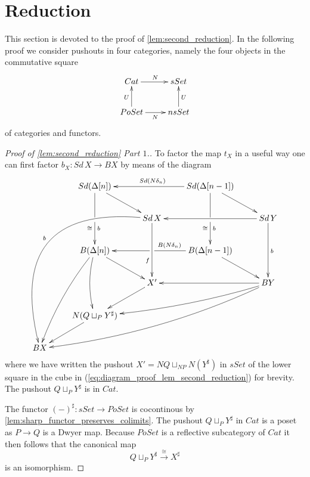 

\section{Reduction}
\label{sec:red}


This section is devoted to the proof of \cref{lem:second_reduction}. In the following proof we consider pushouts in four categories, namely the four objects in the commutative square
\begin{displaymath}
\xymatrix{
Cat \ar[r]^N & sSet \\
PoSet \ar[u]^U \ar[r]_N & nsSet \ar[u]_U
}
\end{displaymath}
of categories and functors.
\begin{proof}[Proof of \cref{lem:second_reduction} Part $1$.]
To factor the map $t_X$ in a useful way one can first factor $b_X:Sd\, X\to BX$ by means of the diagram
\begin{equation}
\label{eq:diagram_proof_lem_second_reduction}
\begin{gathered}
\xymatrix{
& Sd(\Delta [n]) \ar@{-}[d] \ar[dr] && Sd(\Delta [n-1]) \ar[ll]_{Sd(N\delta _n)} \ar@{-}[d] \ar[dr] \\
& \ar[d]_(.3)\cong ^(.3)b & Sd\, X \ar@/_6.3pc/[lldddd]_b \ar[dd]_(.65)f & \ar[d]_(.3)\cong ^(.3)b & Sd\, Y \ar[ll] \ar[dd] ^b \\
& B(\Delta [n]) \ar@/_/[lddd] \ar@/_/[dd] \ar[dr] & \ar[l] & B(\Delta [n-1]) \ar@{-}[l]_(.7){B(N\delta _n)} \ar[dr] \\
&& X' \ar[ld] && BY \ar@/^/[llld] \ar[ll] \ar@/^1pc/[lllldd] \\
& N(Q\sqcup _PY^\sharp ) \ar[ld] \\
BX
}
\end{gathered}
\end{equation}
where we have written the pushout $X'=NQ\sqcup _{NP}N(Y^\sharp )$ in $sSet$ of the lower square in the cube in (\ref{eq:diagram_proof_lem_second_reduction}) for brevity. The pushout $Q\sqcup _PY^\sharp$ is in $Cat$.

The functor $(-)^\sharp :sSet\to PoSet$ is cocontinous by \cref{lem:sharp_functor_preserves_colimits}. The pushout $Q\sqcup _PY^\sharp$ in $Cat$ is a poset \cite[Lem.~5.6.4]{Th80} as $P\to Q$ is a Dwyer map. Because $PoSet$ is a reflective subcategory of $Cat$ it then follows that the canonical map
\[Q\sqcup _PY^\sharp \xrightarrow{\cong } X^\sharp\]
is an isomorphism.


\end{proof}
